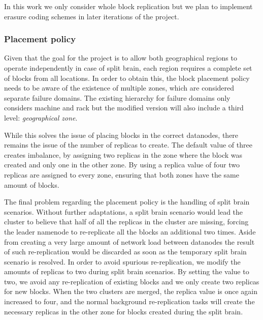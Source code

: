 In this work we only consider whole block replication but we plan to implement erasure coding schemes in later iterations of the project.

\subsubsection{Placement policy}
Given that the goal for the project is to allow both geographical regions to operate independently in case of split brain, each region requires a complete set of blocks from all locations.
In order to obtain this, the block placement policy needs to be aware of the existence of multiple zones, which are considered separate failure domains.
The existing hierarchy for failure domains only considers machine and rack but the modified version will also include a third level: \emph{geographical zone}.

While this solves the issue of placing blocks in the correct datanodes, there remains the issue of the number of replicas to create.
The default value of three creates imbalance, by assigning two replicas in the zone where the block was created and only one in the other zone.
By using a replica value of four two replicas are assigned to every zone, ensuring that both zones have the same amount of blocks.

The final problem regarding the placement policy is the handling of split brain scenarios.
Without further adaptations, a split brain scenario would lead the cluster to believe that half of all the replicas in the cluster are missing, forcing the leader namenode to re-replicate all the blocks an additional two times.
Aside from creating a very large amount of network load between datanodes the result of such re-replication would be discarded as soon as the temporary split brain scenario is resolved.
In order to avoid spurious re-replication, we modify the amounts of replicas to two during split brain scenarios.
By setting the value to two, we avoid any re-replication of existing blocks and we only create two replicas for new blocks.
When the two clusters are merged, the replica value is once again increased to four, and the normal background re-replication tasks will create the necessary replicas in the other zone for blocks created during the split brain.

\subsubsection{}